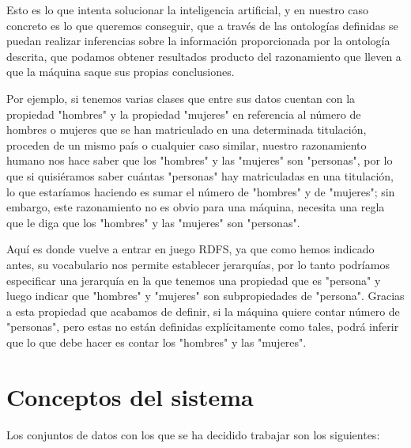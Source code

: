 \bigskip
Esto es lo que intenta solucionar la inteligencia artificial, y en nuestro caso concreto es lo que queremos conseguir, que a través de las ontologías definidas se puedan realizar inferencias sobre la información proporcionada por la ontología descrita, que podamos obtener resultados producto del razonamiento que lleven a que la máquina saque sus propias conclusiones.

\bigskip
Por ejemplo, si tenemos varias clases que entre sus datos cuentan con la propiedad "hombres" y la propiedad "mujeres" en referencia al número de hombres o mujeres que se han matriculado en una determinada titulación, proceden de un mismo país o cualquier caso similar, nuestro razonamiento humano nos hace saber que los "hombres" y las "mujeres" son "personas", por lo que si quisiéramos saber cuántas "personas" hay matriculadas en una titulación, lo que estaríamos haciendo es sumar el número de "hombres" y de "mujeres"; sin embargo, este razonamiento no es obvio para una máquina, necesita una regla que le diga que los "hombres" y las "mujeres" son "personas".

\bigskip
Aquí es donde vuelve a entrar en juego RDFS, ya que como hemos indicado antes, su vocabulario nos permite establecer jerarquías, por lo tanto podríamos especificar una jerarquía en la que tenemos una propiedad que es "persona" y luego indicar que "hombres" y "mujeres" son subpropiedades de "persona". Gracias a esta propiedad que acabamos de definir, si la máquina quiere contar número de "personas", pero estas no están definidas explícitamente como tales, podrá inferir que lo que debe hacer es contar los "hombres" y las "mujeres".

\section{Conceptos del sistema}

Los conjuntos de datos con los que se ha decidido trabajar son los siguientes:

